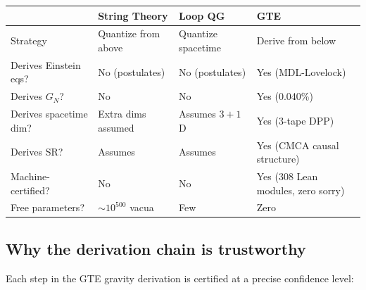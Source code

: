 \documentclass[11pt,a4paper]{article}
\newcommand{\GN}{G_{\!N}}
\begin{document}
\begin{center}
\small
\renewcommand{\arraystretch}{1.4}
\begin{tabular}{P{4.0cm}P{3.1cm}P{3.1cm}P{3.1cm}}
\toprule
& String Theory & Loop QG & GTE \\
\midrule
Strategy & Quantize from above & Quantize spacetime & Derive from below \\
Derives Einstein eqs? & No (postulates) & No (postulates) & Yes (MDL-Lovelock) \\
Derives $\GN$? & No & No & Yes (0.040\%) \\
Derives spacetime dim? & Extra dims assumed & Assumes $3{+}1$D & Yes (3-tape DPP) \\
Derives SR? & Assumes & Assumes & Yes (CMCA causal structure) \\
Machine-certified? & No & No & Yes (308 Lean modules, zero sorry) \\
Free parameters? & $\sim10^{500}$ vacua & Few & Zero \\
\bottomrule
\end{tabular}
\end{center}

\subsection{Why the derivation chain is trustworthy}

Each step in the GTE gravity derivation is certified at a precise confidence level:
\end{document}
